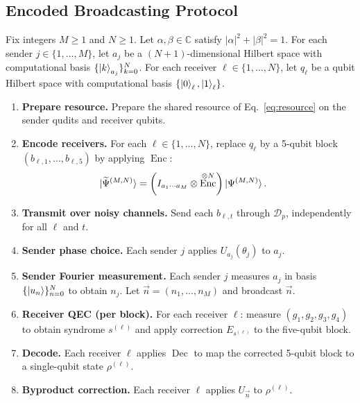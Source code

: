 \documentclass[aps,physrev,10pt,twocolumn,superscriptaddress,floatfix]{revtex4-2}
\DeclareMathOperator{\Enc}{Enc}
\DeclareMathOperator{\Dec}{Dec}
\begin{document}
\subsection{Encoded Broadcasting Protocol}

Fix integers $M\ge 1$ and $N\ge 1$. Let $\alpha,\beta\in\mathbb{C}$ satisfy $|\alpha|^2+|\beta|^2=1$. For each sender $j\in\{1,\dots,M\}$, let $a_j$ be a $(N{+}1)$-dimensional Hilbert space with computational basis $\{\ket{k}_{a_j}\}_{k=0}^N$. For each receiver $\ell\in\{1,\dots,N\}$, let $q_\ell$ be a qubit Hilbert space with computational basis $\{\ket{0}_\ell,\ket{1}_\ell\}$.

\begin{enumerate}
    \item \textbf{Prepare resource.} Prepare the shared resource of Eq.~\eqref{eq:resource} on the sender qudits and receiver qubits.

    \item \textbf{Encode receivers.} For each $\ell\in\{1,\dots,N\}$, replace $q_\ell$ by a 5-qubit block
    $(b_{\ell,1},\dots,b_{\ell,5})$ by applying $\Enc$:
    \begin{align}
    \ket{\widetilde{\Psi}^{(M,N)}}
    &= \left(I_{a_1\cdots a_M}\otimes \Enc^{\otimes N}\right)\ket{\Psi^{(M,N)}}.
    \end{align}

    \item \textbf{Transmit over noisy channels.} Send each $b_{\ell,t}$ through $\mathcal{D}_p$, independently for all $\ell$ and $t$.

    \item \textbf{Sender phase choice.} Each sender $j$ applies $U_{a_j}(\theta_j)$ to $a_j$.

    \item \textbf{Sender Fourier measurement.} Each sender $j$ measures $a_j$ in basis $\{\ket{u_n}\}_{n=0}^N$ to obtain $n_j$.
    Let $\vec{n} =(n_1,\dots,n_M)$ and broadcast $\vec{n}$.

    \item \textbf{Receiver QEC (per block).} For each receiver $\ell$:
    measure $(g_1,g_2,g_3,g_4)$ to obtain syndrome $s^{(\ell)}$ and apply correction $E_{s^{(\ell)}}$ to the five-qubit block.

    \item \textbf{Decode.} Each receiver $\ell$ applies $\Dec$ to map the corrected 5-qubit block to a single-qubit state $\rho^{(\ell)}$.

    \item \textbf{Byproduct correction.} Each receiver $\ell$ applies $U_{\vec{n}}$ to $\rho^{(\ell)}$.
\end{enumerate}
\end{document}
